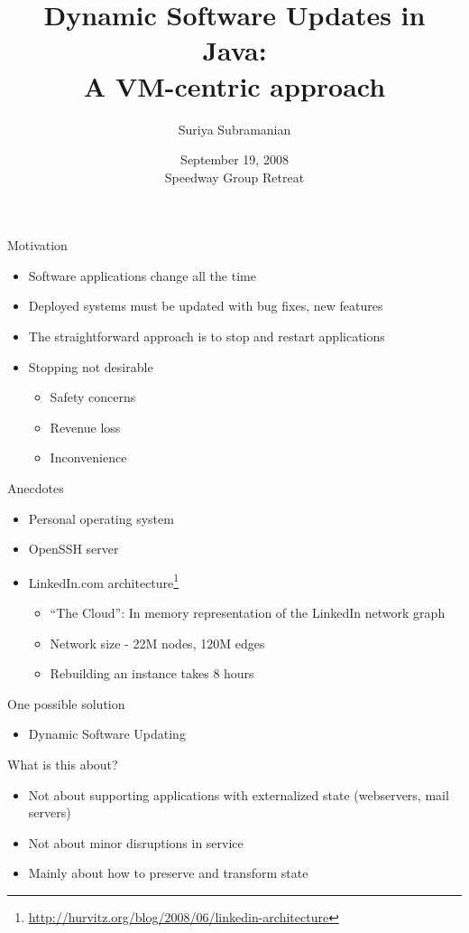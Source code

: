 \documentclass[xcolor=dvipsnames]{beamer}
\title[Dynamic Software Updates in Java]
{Dynamic Software Updates in Java:\\ A VM-centric approach}
\author[Suriya Subramanian]{%
Suriya Subramanian}
\institute[The University of Texas at Austin] %
{
  Department of Computer Sciences\\
  The University of Texas at Austin
}
\date[Short Occasion]
{September 19, 2008\\
Speedway Group Retreat}
\begin{document}
\maketitle

\begin{frame}{Motivation}%
\begin{itemize}
\item Software applications change all the time
\item Deployed systems must be updated with bug fixes, new features
\item The straightforward approach is to stop and restart applications
\item Stopping not desirable
  \begin{itemize}
  \item Safety concerns
  \item Revenue loss
  \item Inconvenience
  \end{itemize}
\end{itemize}
\end{frame}

\begin{frame}{Anecdotes}%
\begin{itemize}
\item Personal operating system
\item OpenSSH server
\item LinkedIn.com architecture\footnote{\scriptsize{\url{http://hurvitz.org/blog/2008/06/linkedin-architecture}}}
  \begin{itemize}
  \item ``The Cloud'': In memory representation of the LinkedIn network graph
  \item Network size - 22M nodes, 120M edges
  \item Rebuilding an instance takes 8 hours
  \end{itemize}
\end{itemize}
\end{frame}

\begin{frame}{One possible solution}%
\begin{itemize}
\item Dynamic Software Updating
\end{itemize}
\end{frame}

\begin{frame}{What is this about?}%
\begin{itemize}
\item Not about supporting applications with externalized state
(webservers, mail servers)
\item Not about minor disruptions in service
\item Mainly about how to preserve and transform state
\end{itemize}
\end{frame}
\end{document}
